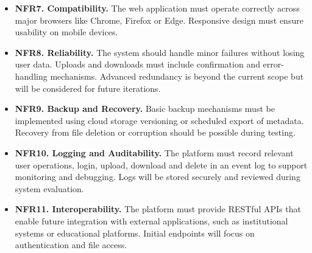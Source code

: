 \begin{itemize}
    \item \textbf{NFR7. Compatibility.}
    The web application must operate correctly across major browsers like Chrome, Firefox or Edge. Responsive design must ensure usability on mobile devices.

    \item \textbf{NFR8. Reliability.}
    The system should handle minor failures without losing user data. Uploads and downloads must include confirmation and error-handling mechanisms. Advanced redundancy is beyond the current scope but will be considered for future iterations.

    \item \textbf{NFR9. Backup and Recovery.}
    Basic backup mechanisms must be implemented using cloud storage versioning or scheduled export of metadata. Recovery from file deletion or corruption should be possible during testing.

    \item \textbf{NFR10. Logging and Auditability.}
    The platform must record relevant user operations, login, upload, download and delete in an event log to support monitoring and debugging. Logs will be stored securely and reviewed during system evaluation.

    \item \textbf{NFR11. Interoperability.}
    The platform must provide RESTful APIs that enable future integration with external applications, such as institutional systems or educational platforms. Initial endpoints will focus on authentication and file access.
\end{itemize}
